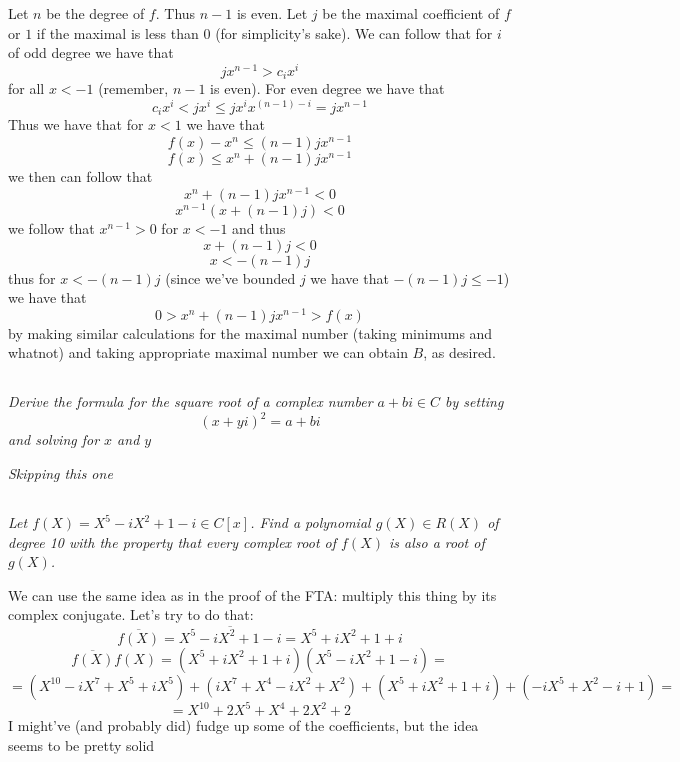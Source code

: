 \documentclass[11pt,oneside,titlepage]{book}
\begin{document}
Let $n$ be the degree of $f$. Thus $n - 1$ is even.  Let $j$ be the
maximal coefficient of $f$ or $1$ if the maximal is less than 0 (for
simplicity's sake). We can follow that for $i$ of odd degree we have
that
$$j x^{n - 1} > c_i x^i$$
for all $x < -1$ (remember, $n - 1$ is even). For even degree we have that
$$c_i x^i < j x^i \leq j x^i x^{(n - 1) - i} = j x^{n - 1}$$
Thus we have that for $x < 1$ we have that
$$f(x) - x^n \leq (n - 1 ) j x^{n - 1} $$
$$f(x) \leq x^n + (n - 1 ) j x^{n - 1} $$
we then can follow that
$$x^n + (n - 1 ) j x^{n - 1} < 0$$
$$x^{n - 1}(x + (n - 1 ) j)  < 0$$
we follow that $x^{n - 1} > 0$ for $x < -1$ and thus
$$x + (n - 1 ) j  < 0$$
$$x  < - (n - 1 ) j$$
thus for $x < - (n - 1 )j$ (since we've bounded $j$ we have that $- (n - 1 )j \leq -1$)
we have that
$$0 > x^n + (n - 1 ) j x^{n - 1} > f(x)$$
by making similar calculations for the maximal number (taking minimums and whatnot)
and taking appropriate maximal number we can obtain $B$, as desired.

\subsection{}

\textit{Derive the formula for the square root of a complex number $a + bi \in C$
  by setting
  $$ (x + yi)^2 = a + bi$$
  and solving for $x$ and $y$
}

\textit{Skipping this one}

\subsection{}

\textit{Let $f(X) = X^5 - iX^2 + 1 - i \in C[x]$. Find a polynomial
  $g(X) \in R(X)$ of degree 10 with the property that every complex root
  of $f(X)$ is also a root of $g(X)$.}

We can use the same idea as in the proof of the FTA: multiply this
thing by its complex conjugate. Let's try to do that:
$$\overline{f(X)} = \overline{X^5 - iX^2 + 1 - i} = X^5 + iX^2 + 1 + i$$
$$\overline{f(X)}f(X) = (X^5 + iX^2 + 1 + i)(X^5 - iX^2 + 1 - i) = $$
$$ = (X^{10} - iX^7 + X^5 + iX^5) + (iX^7 + X^4 - iX^2 + X^2) +
(X^5 + iX^2 + 1 + i) + (-iX^5 + X^2 -i + 1) = $$
$$ = X^{10} + 2X^5 + X^4  + 2X^2 + 2$$
I might've (and probably did) fudge up some of the coefficients, but
the idea seems to be pretty solid

\subsection{}
\end{document}
